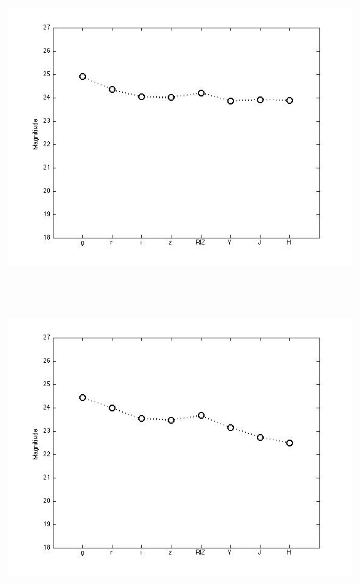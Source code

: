 \documentclass[useAMS,usenatbib,fleqn]{mn2e}
\begin{document}
\begin{figure}
\begin{subfigure}[b]{0.075\textwidth}
                \includegraphics[trim = 35px 15px 50px 25px, clip=true,width=\textwidth]{figures/basis_09.jpg}
        \end{subfigure}
        ~
        \begin{subfigure}[b]{0.075\textwidth}
                \includegraphics[trim = 35px 15px 50px 25px, clip=true,width=\textwidth]{figures/basis_10.jpg}
        \end{subfigure}
        

\end{figure}
\end{document}
